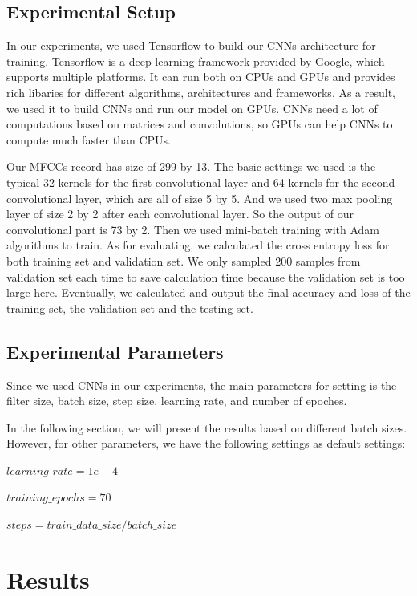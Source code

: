 \documentclass{article}
\begin{document}
\subsection{Experimental Setup}

In our experiments, we used Tensorflow to build our CNNs architecture for training. Tensorflow is a deep learning framework provided by Google, which supports multiple platforms. It can run both on CPUs and GPUs and provides rich libaries for different algorithms, architectures and frameworks. As a result, we used it to build CNNs and run our model on GPUs. CNNs need a lot of computations based on matrices and convolutions, so GPUs can help CNNs to compute much faster than CPUs.

Our MFCCs record has size of 299 by 13. The basic settings we used is the typical 32 kernels for the first convolutional layer and 64 kernels for the second convolutional layer, which are all of size 5 by 5. And we used two max pooling layer of size 2 by 2 after each convolutional layer. So the output of our convolutional part is 73 by 2. Then we used mini-batch training with Adam algorithms to train. As for evaluating, we calculated the cross entropy loss for both training set and validation set. We only sampled 200 samples from validation set each time to save calculation time because the validation set is too large here. Eventually, we calculated and output the final accuracy and loss of the training set, the validation set and the testing set.

\subsection{Experimental Parameters}

Since we used CNNs in our experiments, the main parameters for setting is the filter size, batch size, step size, learning rate, and number of epoches.

In the following section, we will present the results based on different batch sizes. However, for other parameters, we have the following settings as default settings:

\setlength{\parindent}{5ex}
$learning\_rate = 1e-4$\par
\setlength{\parindent}{5ex}
$training\_epochs = 70$\par
\setlength{\parindent}{5ex}
$steps = train\_data\_size/batch\_size$\par

\section{Results}
\end{document}
